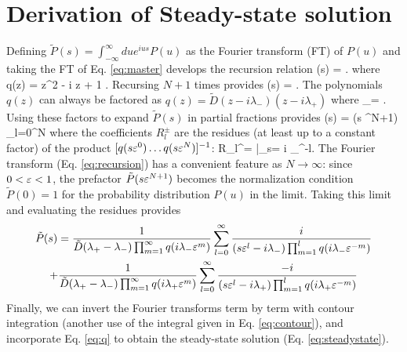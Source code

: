 \section{Derivation of Steady-state solution}
\label{sec:langsteadyderiv}
Defining $\tilde{P}(s) = \int_{-\infty}^\infty du e^{i u s} P(u) $ as the Fourier transform (FT) of $P(u)$ and taking the FT of Eq. \ref{eq:master} develops the recursion relation
\be {}(s) = . \ee
where
\be q(z) =  z^2 - i \tilde{\Gamma} z + 1 . \label{eq:q} \ee
Recursing $N+1$ times provides
\be {}(s) = .\label{eq:recursion}\ee
The polynomials $q(z)$ can always be factored as $q(z) = \tilde{D}(z - i\lambda_-)(z - i\lambda_+)$ where
\be \lambda_\pm = . \label{eq:lambdas}\ee
Using these factors to expand $\tilde{P}(s)$ in partial fractions provides
\be {}(s)  = (s \ve^{N+1}) \sum_{l=0}^N   \ee
where the coefficients $R_l^\pm$ are the residues (at least up to a constant factor) of the product $[q(s\varepsilon^0)\dots q(s\varepsilon^N)]^{-1}$:
\be R_l^\pm =  \Big|_{s= i \lambda_\pm \ve^{-l}}.\ee
The Fourier transform (Eq. \ref{eq:recursion}) has a convenient feature as $N\rightarrow \infty$: since $0<\varepsilon <1$, the prefactor $\tilde{P}( s \varepsilon^{N+1})$ becomes the normalization condition $\tilde{P}(0)=1$ for the probability distribution $P(u)$ in the limit.
Taking this limit and evaluating the residues provides 
\begin{multline} \tilde{P}(s) = \frac{1}{\tilde{D}(\lambda_+ - \lambda_-) \prod_{m=1}^\infty q(i \lambda_- \varepsilon^m)} \sum_{l=0}^\infty \frac{i}{(s\varepsilon^l-i\lambda_-)\prod_{m=1}^l q(i\lambda_- \varepsilon^{-m})} 
	\\+ \frac{1}{\tilde{D}(\lambda_+ - \lambda_-) \prod_{m=1}^\infty q(i \lambda_+ \varepsilon^m)} \sum_{l=0}^\infty \frac{-i}{(s\varepsilon^l-i \lambda_+)\prod_{m=1}^l q(i\lambda_+ \varepsilon^{-m})} \end{multline}
Finally, we can invert the Fourier transforms term by term with contour integration (another use of the integral given in Eq. \ref{eq:contour}), and incorporate Eq. \ref{eq:q} to obtain the steady-state solution (Eq. \ref{eq:steadystate}).

